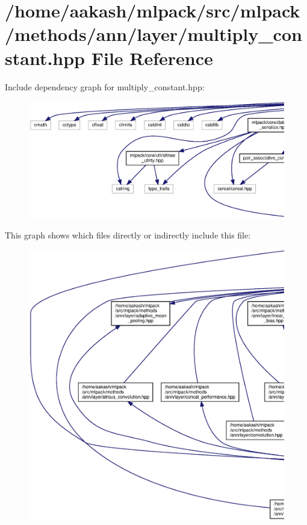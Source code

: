 \section{/home/aakash/mlpack/src/mlpack/methods/ann/layer/multiply\+\_\+constant.hpp File Reference}
\label{multiply__constant_8hpp}
Include dependency graph for multiply\+\_\+constant.\+hpp\+:
\nopagebreak
\begin{figure}[H]
\begin{center}
\leavevmode
\includegraphics[width=350pt]{multiply__constant_8hpp__incl}
\end{center}
\end{figure}
This graph shows which files directly or indirectly include this file\+:
\nopagebreak
\begin{figure}[H]
\begin{center}
\leavevmode
\includegraphics[width=350pt]{multiply__constant_8hpp__dep__incl}
\end{center}
\end{figure}
